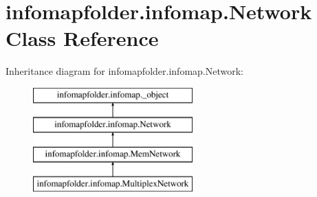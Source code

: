 \hypertarget{classinfomapfolder_1_1infomap_1_1Network}{}\section{infomapfolder.\+infomap.\+Network Class Reference}
\label{classinfomapfolder_1_1infomap_1_1Network}
Inheritance diagram for infomapfolder.\+infomap.\+Network\+:\begin{figure}[H]
\begin{center}
\leavevmode
\includegraphics[height=4.000000cm]{classinfomapfolder_1_1infomap_1_1Network}
\end{center}
\end{figure}
